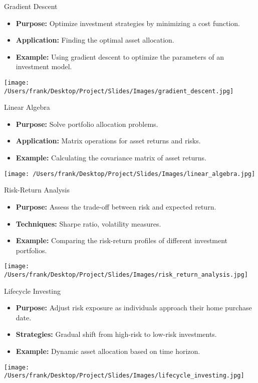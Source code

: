 \documentclass{beamer}
\begin{document}
\begin{frame}{Gradient Descent}
    \begin{itemize}
        \item \textbf{Purpose:} Optimize investment strategies by minimizing a cost function.
        \item \textbf{Application:} Finding the optimal asset allocation.
        \item \textbf{Example:} Using gradient descent to optimize the parameters of an investment model.
    \end{itemize}
    \centering
    \texttt{[image: /Users/frank/Desktop/Project/Slides/Images/gradient\_descent.jpg]}
\end{frame}

\begin{frame}{Linear Algebra}
    \begin{itemize}
        \item \textbf{Purpose:} Solve portfolio allocation problems.
        \item \textbf{Application:} Matrix operations for asset returns and risks.
        \item \textbf{Example:} Calculating the covariance matrix of asset returns.
    \end{itemize}
    \centering
    \texttt{[image: /Users/frank/Desktop/Project/Slides/Images/linear\_algebra.jpg]}
\end{frame}

\begin{frame}{Risk-Return Analysis}
    \begin{itemize}
        \item \textbf{Purpose:} Assess the trade-off between risk and expected return.
        \item \textbf{Techniques:} Sharpe ratio, volatility measures.
        \item \textbf{Example:} Comparing the risk-return profiles of different investment portfolios.
    \end{itemize}
    \centering
    \texttt{[image: /Users/frank/Desktop/Project/Slides/Images/risk\_return\_analysis.jpg]}
\end{frame}

\begin{frame}{Lifecycle Investing}
    \begin{itemize}
        \item \textbf{Purpose:} Adjust risk exposure as individuals approach their home purchase date.
        \item \textbf{Strategies:} Gradual shift from high-risk to low-risk investments.
        \item \textbf{Example:} Dynamic asset allocation based on time horizon.
    \end{itemize}
    \centering
    \texttt{[image: /Users/frank/Desktop/Project/Slides/Images/lifecycle\_investing.jpg]}
\end{frame}
\end{document}
